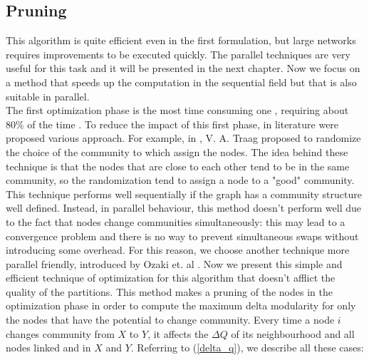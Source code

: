 \subsection{Pruning}\label{prun}
This algorithm is quite efficient even in the first formulation, but large networks requires improvements to be executed quickly. The parallel techniques are very useful for this task and it will be presented in the next chapter. Now we focus on a method that speeds up the computation in the sequential field but that is also suitable in parallel.\\
The first optimization phase is the most time consuming one \cite{Blondel_2008}, requiring about 80\% of the time \cite{wickramaarachchi2014fast}. To reduce the impact of this first phase, in literature were proposed various approach. For example, in \cite{rand}, V. A. Traag proposed to randomize the choice of the community to which assign the nodes. The idea behind these technique is that the nodes that are close to each other tend to be in the same community, so the randomization tend to assign a node to a "good" community. This technique performs well sequentially if the graph has a community structure well defined. Instead, in parallel behaviour, this method doesn't perform well due to the fact that nodes change communities simultaneously: this may lead to a convergence problem and there is no way to prevent simultaneous swaps without introducing some overhead. For this reason, we choose another technique more parallel friendly, introduced by Ozaki et. al \cite{pruning}. Now we present this simple and efficient technique of optimization for this algorithm that doesn't afflict the quality of the partitions. This method makes a pruning of the nodes in the optimization phase in order to compute the maximum delta modularity for only the nodes that have the potential to change community.
Every time a node $i$ changes community from $X$ to $Y$, it affects the $\Delta Q$ of its neighbourhood and all nodes linked and in $X$ and $Y$. Referring to (\ref{delta_q}), we describe all these cases:
